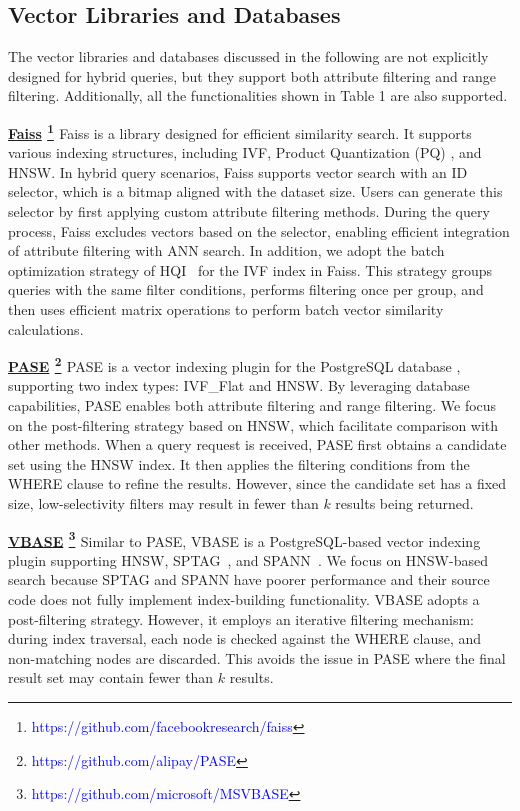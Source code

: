 \documentclass[sigconf, nonacm]{acmart}
\begin{document}
{	
	
	\subsection{Vector Libraries and Databases}
	
	The vector libraries and databases discussed in the following are not explicitly designed for hybrid queries, but they support both attribute filtering and range filtering. Additionally, all the functionalities shown in Table 1 are also supported.
	
	\noindent\textbf{\underline{Faiss} \footnote{\textcolor{blue}{https://github.com/facebookresearch/faiss}} \cite{Faiss}}
	Faiss is a library designed for efficient similarity search. It supports various indexing structures, including IVF, Product Quantization (PQ) \cite{PQ}, and HNSW. In hybrid query scenarios, Faiss supports vector search with an ID selector, which is a bitmap aligned with the dataset size. Users can generate this selector by first applying custom attribute filtering methods. During the query process, Faiss excludes vectors based on the selector, enabling efficient integration of attribute filtering with ANN search. In addition, we adopt the batch optimization strategy of HQI~\cite{HQI} for the IVF index in Faiss. This strategy groups queries with the same filter conditions, performs filtering once per group, and then uses efficient matrix operations to perform batch vector similarity calculations.
	
	
	\noindent\textbf{\underline{PASE} \footnote{\textcolor{blue}{https://github.com/alipay/PASE}} \cite{pase}}
	PASE is a vector indexing plugin for the PostgreSQL database \cite{postgresql13.4}, supporting two index types: IVF\_Flat \cite{johnson2019billion} and HNSW. By leveraging database capabilities, PASE enables both attribute filtering and range filtering. We focus on the post-filtering strategy based on HNSW, which facilitate comparison with other methods. When a query request is received, PASE first obtains a candidate set using the HNSW index. It then applies the filtering conditions from the WHERE clause to refine the results. However, since the candidate set has a fixed size, low-selectivity filters may result in fewer than $k$ results being returned.
	
	
	\noindent\textbf{\underline{VBASE} \footnote{\textcolor{blue}{https://github.com/microsoft/MSVBASE}} \cite{vbase}}
	Similar to PASE, VBASE is a PostgreSQL-based vector indexing plugin supporting HNSW, SPTAG~\cite{sptag}, and SPANN~\cite{spann}. We focus on HNSW-based search because SPTAG and SPANN have poorer performance and their source code does not fully implement index-building functionality. VBASE adopts a post-filtering strategy. However, it employs an iterative filtering mechanism: during index traversal, each node is checked against the WHERE clause, and non-matching nodes are discarded. This avoids the issue in PASE where the final result set may contain fewer than $k$ results.
	
}
\end{document}
